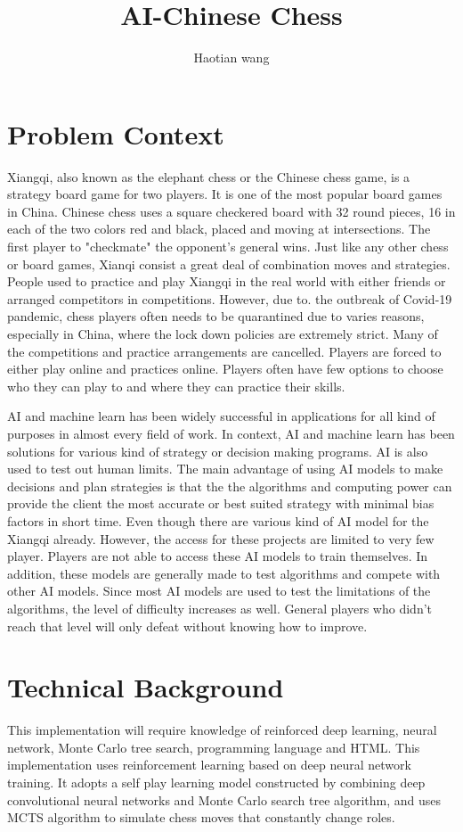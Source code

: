 \documentclass[10pt,twocolumn]{article}
\title{AI-Chinese Chess}
\author{Haotian wang}
\affiliation{Occidental College}
\begin{document}
\maketitle

\section{Problem Context}
    Xiangqi, also known as the elephant chess or the Chinese chess game, is a strategy board game for two players. It is one of the most popular board games in China. Chinese chess uses a square checkered board with 32 round pieces, 16 in each of the two colors red and black, placed and moving at intersections. The first player to "checkmate" the opponent's general wins. Just like any other chess or board games, Xianqi consist a great deal of combination moves and strategies\cite{XiangQi}.
    People used to practice and play Xiangqi in the real world with either friends or arranged competitors in competitions. However, due to. the outbreak of Covid-19 pandemic, chess players often needs to be quarantined due to varies reasons, especially in China, where the lock down policies are extremely strict. Many of the competitions and practice arrangements are cancelled. Players are forced to either play online and practices online.  Players often have few options to choose who they can play to and where they can practice their skills. 
    
    AI and machine learn has been widely successful in applications for all kind of purposes in almost every field of work. In context, AI and machine learn has been solutions for various kind of strategy or decision making programs. AI is also used to test out human limits. The main advantage of using AI models to make decisions and plan strategies is that the the algorithms and computing power can provide the client the most accurate or best suited strategy with minimal bias factors in short time. Even though there are various kind of AI model for the Xiangqi already. However, the access for these projects are limited to very few player. Players are not able to access these AI models to train themselves. In addition, these models are generally made to test algorithms and compete with other AI models\cite{4M}. Since most AI models are used to test the limitations of the algorithms, the level of difficulty increases as well. General players who didn't reach that level will only defeat without knowing how to improve. 
    
\section{Technical Background}
	This implementation will require knowledge of reinforced deep learning, neural network, 
	Monte Carlo tree search, programming language and HTML. This implementation uses reinforcement learning based on deep neural network training. It adopts a self play learning model constructed by combining deep convolutional neural networks and Monte Carlo search tree algorithm, and uses MCTS algorithm to simulate chess moves that constantly change roles. 
	
\end{document}
